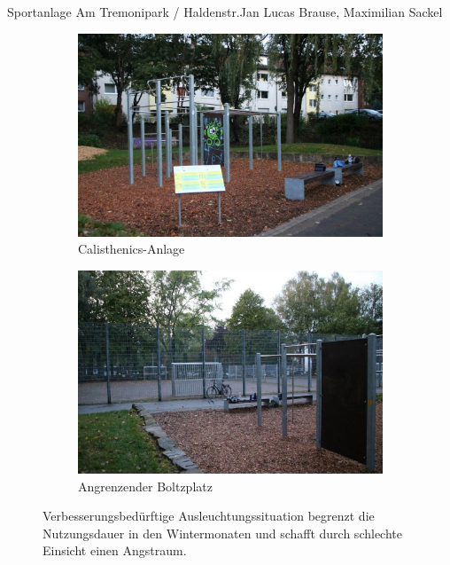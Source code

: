 \documentclass{../../templates/amendment}
\begin{document}
\begin{boxed}{Sportanlage Am Tremonipark / Haldenstr.}{Jan Lucas Brause, Maximilian Sackel}
    \begin{figure}[htpb]
        \centering
        \begin{subfigure}[]{0.49\textwidth}
            \begin{center}
                \includegraphics[width=\linewidth]{pictures/photo1.jpg}
                \caption{Calisthenics-Anlage}%
            \end{center}
        \end{subfigure}
        \begin{subfigure}[]{0.49\textwidth}
            \begin{center}
                \includegraphics[width=\linewidth]{pictures/photo3.jpg}
                \caption{Angrenzender Boltzplatz}%
            \end{center}
        \end{subfigure}
        \caption{Verbesserungsbedürftige Ausleuchtungssituation begrenzt die
            Nutzungsdauer in den Wintermonaten und schafft durch schlechte Einsicht
        einen Angstraum.}
    \end{figure}


\end{boxed}
\end{document}

